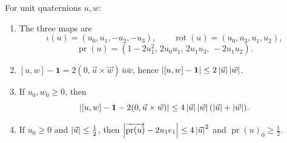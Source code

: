 \begin{lemma}
\label{lem:reductions-quaternion-identities}
For unit quaternions $u,w$:
\begin{enumerate}[label=(\roman*)]
\item The three maps are
\[
 \iota(u)=(u_0,u_1,-u_2,-u_3),\qquad
 \operatorname{rot}(u)=(u_0,u_3,u_1,u_2),
\]
\[
 \operatorname{pr}(u)=(1-2u_1^2,\,2u_0u_1,\,2u_1u_3,\,-2u_1u_2).
\]
\item $[u,w]-\mathbf1=2(0,\vec u\times\vec w)\,\bar u\bar w$, hence
$\left\lvert[u,w]-\mathbf1\right\rvert\le2\left\lvert\vec u\right\rvert\left\lvert\vec w\right\rvert$.
\item If $u_0,w_0\ge0$, then
\[
 \left\lvert[u,w]-\mathbf1-2(0,\vec u\times\vec w)\right\rvert
 \le4\left\lvert\vec u\right\rvert\left\lvert\vec w\right\rvert(\left\lvert\vec u\right\rvert+\left\lvert\vec w\right\rvert).
\]
\item If $u_0\ge0$ and $\left\lvert\vec u\right\rvert\le\frac12$, then
$\left\lvert\overrightarrow{\operatorname{pr}(u)}-2u_1e_1\right\rvert\le4\left\lvert\vec u\right\rvert^2$ and $\operatorname{pr}(u)_0\ge\frac12$.
\end{enumerate}
\end{lemma}

